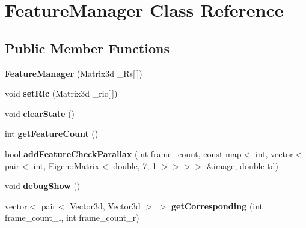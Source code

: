 \hypertarget{classFeatureManager}{}\section{Feature\+Manager Class Reference}
\label{classFeatureManager}
\subsection*{Public Member Functions}
\begin{DoxyCompactItemize}
\item 
\mbox{\label{classFeatureManager_a6d4c8865fc3748e58692bd24d43ccfa2}} 
{\bfseries Feature\+Manager} (Matrix3d \+\_\+\+Rs\mbox{[}$\,$\mbox{]})
\item 
\mbox{\label{classFeatureManager_a39e86bfd72cdac813a10618d71504f5f}} 
void {\bfseries set\+Ric} (Matrix3d \+\_\+ric\mbox{[}$\,$\mbox{]})
\item 
\mbox{\label{classFeatureManager_a9fcd13083275808900edd01bd854d74c}} 
void {\bfseries clear\+State} ()
\item 
\mbox{\label{classFeatureManager_af7714129ee3c9fd9b93e813217fbe2c0}} 
int {\bfseries get\+Feature\+Count} ()
\item 
\mbox{\label{classFeatureManager_a20b92daab4176151bc4314c269c1be61}} 
bool {\bfseries add\+Feature\+Check\+Parallax} (int frame\+\_\+count, const map$<$ int, vector$<$ pair$<$ int, Eigen\+::\+Matrix$<$ double, 7, 1 $>$$>$$>$$>$ \&image, double td)
\item 
\mbox{\label{classFeatureManager_a9c843caa5dd8831548a80b847904f801}} 
void {\bfseries debug\+Show} ()
\item 
\mbox{\label{classFeatureManager_aa8a8ce48602b74b99e58688415352f48}} 
vector$<$ pair$<$ Vector3d, Vector3d $>$ $>$ {\bfseries get\+Corresponding} (int frame\+\_\+count\+\_\+l, int frame\+\_\+count\+\_\+r)
\item 
\mbox{\label{classFeatureManager_a7db4309f2ba5b8132f24cbe1dbeed9e8}} 
$$
\end{DoxyCompactItemize}
